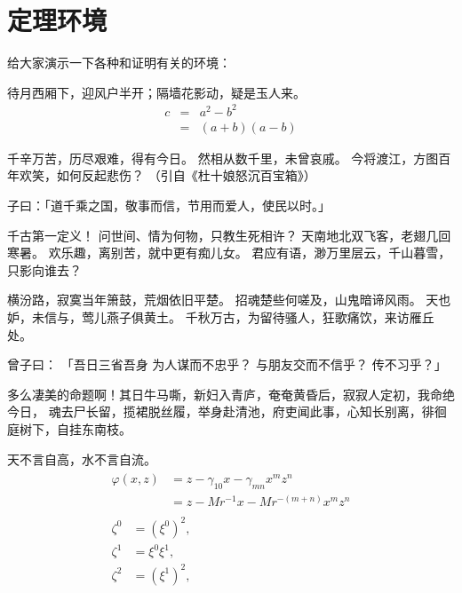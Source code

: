 \section{定理环境}
\label{sec:theorem}

给大家演示一下各种和证明有关的环境：

\begin{assumption}
待月西厢下，迎风户半开；隔墙花影动，疑是玉人来。
\begin{eqnarray}
  \label{eq:eqnxmp}
  c & = & a^2 - b^2\\
    & = & (a+b)(a-b)
\end{eqnarray}
\end{assumption}

千辛万苦，历尽艰难，得有今日。
然相从数千里，未曾哀戚。
今将渡江，方图百年欢笑，如何反起悲伤？
（引自《杜十娘怒沉百宝箱》）

\begin{definition}
子曰：「道千乘之国，敬事而信，节用而爱人，使民以时。」
\end{definition}

千古第一定义！
问世间、情为何物，只教生死相许？
天南地北双飞客，老翅几回寒暑。
欢乐趣，离别苦，就中更有痴儿女。
君应有语，渺万里层云，千山暮雪，只影向谁去？

横汾路，寂寞当年箫鼓，荒烟依旧平楚。
招魂楚些何嗟及，山鬼暗谛风雨。
天也妒，未信与，莺儿燕子俱黄土。
千秋万古，为留待骚人，狂歌痛饮，来访雁丘处。

\begin{proposition}
曾子曰：
「吾日三省吾身 \pozhehao 为人谋而不忠乎？
与朋友交而不信乎？
传不习乎？」
\end{proposition}

多么凄美的命题啊！其日牛马嘶，新妇入青庐，奄奄黄昏后，寂寂人定初，我命绝今日，
魂去尸长留，揽裙脱丝履，举身赴清池，府吏闻此事，心知长别离，徘徊庭树下，自挂东南枝。

\begin{remark}
天不言自高，水不言自流。
\begin{gather*}
\begin{split} 
\varphi(x,z)
&=z-\gamma_{10}x-\gamma_{mn}x^mz^n\\
&=z-Mr^{-1}x-Mr^{-(m+n)}x^mz^n
\end{split}\\[6pt]
\begin{align} \zeta^0&=(\xi^0)^2,\\
\zeta^1 &=\xi^0\xi^1,\\
\zeta^2 &=(\xi^1)^2,
\end{align}
\end{gather*}
\end{remark}

